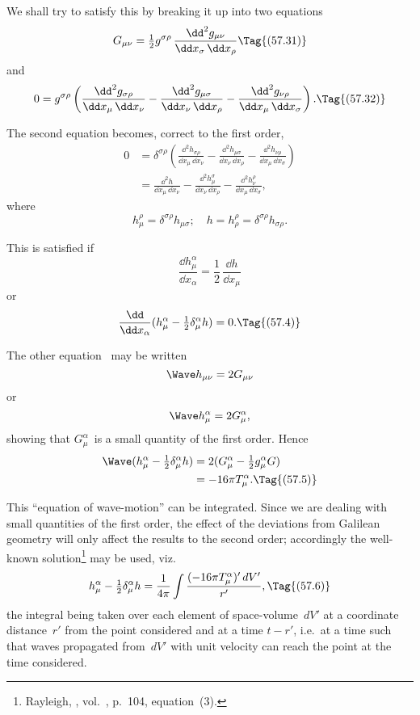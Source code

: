 \documentclass[12pt]{book}
\begin{document}
We shall try to satisfy this by breaking it up into two equations
\[
G_{\mu\nu}
= \tfrac{1}{2}g^{\sigma\rho}\, \frac{\dd^{2} g_{\mu\nu}}{\dd x_{\sigma}\, \dd x_{\rho}}
\Tag{(57.31)}
\]
and
\[
0 = g^{\sigma\rho} \left(\frac{\dd^{2} g_{\sigma\rho}}{\dd x_{\mu}\, \dd x_{\nu}}
  - \frac{\dd^{2} g_{\mu\sigma}}{\dd x_{\nu}\, \dd x_{\rho}}
  - \frac{\dd^{2} g_{\nu\rho}}{\dd x_{\mu}\, \dd x_{\sigma}}\right).
\Tag{(57.32)}
\]

The second equation becomes, correct to the first order,
\begin{align*}
  0 &= \delta^{\sigma\rho} \left(
    \frac{\dd^{2} h_{\sigma\rho}}{\dd x_{\mu}\, \dd x_{\nu}}
  - \frac{\dd^{2} h_{\mu\sigma}}{\dd x_{\nu}\, \dd x_{\rho}}
  - \frac{\dd^{2} h_{\nu\rho}}{\dd x_{\mu}\, \dd x_{\sigma}}\right) \\
  &= \frac{\dd^{2} h}{\dd x_{\mu}\, \dd x_{\nu}}
  - \frac{\dd^{2} h_{\mu}^{\sigma}}{\dd x_{\nu}\, \dd x_{\rho}}
  - \frac{\dd^{2} h_{\nu}^{\rho}}{\dd x_{\mu}\, \dd x_{\sigma}},
\end{align*}
where
\[
h_{\mu}^{\rho} = \delta^{\sigma\rho} h_{\mu\sigma};\quad
h = h_{\rho}^{\rho} = \delta^{\sigma\rho} h_{\sigma\rho}.
\]

This is satisfied if
\[
\frac{\dd h_{\mu}^{\alpha}}{\dd x_{\alpha}}
= \frac{1}{2}\, \frac{\dd h}{\dd x_{\mu}}
\]
or
\[
\frac{\dd}{\dd x_{\alpha}} (h_{\mu}^{\alpha} - \tfrac{1}{2} \delta_{\mu}^{\alpha} h) = 0.
\Tag{(57.4)}
\]

The other equation~ may be written
\[
\Wave h_{\mu\nu} = 2G_{\mu\nu}
\]
or
\[
\Wave h_{\mu}^{\alpha} = 2G_{\mu}^{\alpha},
\]
showing that $G_{\mu}^{\alpha}$~is a small quantity of the first order. Hence
\begin{align*}
  \Wave (h_{\mu}^{\alpha} - \tfrac{1}{2} \delta_{\mu}^{\alpha} h)
  &= 2(G_{\mu}^{\alpha} - \tfrac{1}{2} g_{\mu}^{\alpha} G) \\
  &= -16\pi T_{\mu}^{\alpha}.
  \Tag{(57.5)}
\end{align*}

This ``equation of wave-motion'' can be integrated. Since we are dealing
with small quantities of the first order, the effect of the deviations from
Galilean geometry will only affect the results to the second order; accordingly
the well-known solution\footnote
  {Rayleigh, , vol.~, p.~104, equation~(3).}
may be used, viz.\
\[
h_{\mu}^{\alpha} - \tfrac{1}{2} \delta_{\mu}^{\alpha} h
= \frac{1}{4\pi} \int \frac{(-16\pi T_{\mu}^{\alpha})'\, dV'}{r'},
\Tag{(57.6)}
\]
the integral being taken over each element of space-volume~$dV'$ at a coordinate
distance~$r'$ from the point considered and at a time $t - r'$, i.e.\ at a time
such that waves propagated from~$dV'$ with unit velocity can reach the point
at the time considered.
\end{document}

